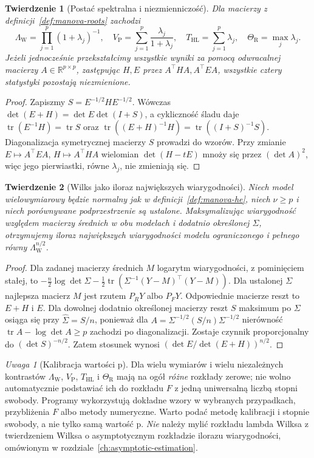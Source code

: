 \documentclass[11pt,a4paper,oneside]{report}
\numberwithin{equation}{chapter}
\theoremstyle{plain}
\newtheorem{twierdzenie}{Twierdzenie}[chapter]
\theoremstyle{definition}
\theoremstyle{remark}
\newtheorem{uwaga}{Uwaga}[chapter]
\newcommand{\R}{\mathbb R}
\begin{document}
\begin{twierdzenie}[Postać spektralna i niezmienniczość]\label{thm:manova-spectra}
Dla macierzy z definicji~\ref{def:manova-roots} zachodzi
\[
 \Lambda_{\mathrm W}=\prod_{j=1}^p(1+\lambda_j)^{-1},\quad
 V_{\mathrm P}=\sum_{j=1}^p\frac{\lambda_j}{1+\lambda_j},\quad
 T_{\mathrm{HL}}=\sum_{j=1}^p\lambda_j,\quad \Theta_{\mathrm R}=\max_j\lambda_j.
\]
Jeżeli jednocześnie przekształcimy wszystkie wyniki za pomocą odwracalnej macierzy $A\in\R^{p\times p}$, zastępując $H,E$ przez $A^\top HA,A^\top EA$, wszystkie cztery statystyki pozostają niezmienione.
\end{twierdzenie}
\begin{proof}
Zapiszmy $S=E^{-1/2}HE^{-1/2}$. Wówczas $\det(E+H)=\det E\det(I+S)$, a cykliczność śladu daje $\operatorname{tr}(E^{-1}H)=\operatorname{tr}S$ oraz $\operatorname{tr}((E+H)^{-1}H)=\operatorname{tr}((I+S)^{-1}S)$. Diagonalizacja symetrycznej macierzy $S$ prowadzi do wzorów. Przy zmianie $E\mapsto A^\top EA$, $H\mapsto A^\top HA$ wielomian $\det(H-tE)$ mnoży się przez $(\det A)^2$, więc jego pierwiastki, równe $\lambda_j$, nie zmieniają się.
\end{proof}

\begin{twierdzenie}[Wilks jako iloraz największych wiarygodności]\label{thm:wilks-lrt-manova}
Niech model wielowymiarowy będzie normalny jak w definicji~\ref{def:manova-he}, niech $\nu\ge p$ i niech porównywane podprzestrzenie są ustalone. Maksymalizując wiarygodność względem macierzy średnich w obu modelach i dodatnio określonej $\Sigma$, otrzymujemy iloraz największych wiarygodności modelu ograniczonego i pełnego równy $\Lambda_{\mathrm W}^{n/2}$.
\end{twierdzenie}
\begin{proof}
Dla zadanej macierzy średnich $M$ logarytm wiarygodności, z pominięciem stałej, to $-\frac n2\log\det\Sigma-\frac12\operatorname{tr}(\Sigma^{-1}(Y-M)^\top(Y-M))$. Dla ustalonej $\Sigma$ najlepsza macierz $M$ jest rzutem $P_RY$ albo $P_FY$. Odpowiednie macierze reszt to $E+H$ i $E$. Dla dowolnej dodatnio określonej macierzy reszt $S$ maksimum po $\Sigma$ osiąga się przy $\widehat\Sigma=S/n$, ponieważ dla $A=\Sigma^{-1/2}(S/n)\Sigma^{-1/2}$ nierówność $\operatorname{tr}A-\log\det A\ge p$ zachodzi po diagonalizacji. Zostaje czynnik proporcjonalny do $(\det S)^{-n/2}$. Zatem stosunek wynosi $(\det E/\det(E+H))^{n/2}$.
\end{proof}

\begin{uwaga}[Kalibracja wartości p]
Dla wielu wymiarów i wielu niezależnych kontrastów $\Lambda_{\mathrm W}$, $V_{\mathrm P}$, $T_{\mathrm{HL}}$ i $\Theta_{\mathrm R}$ mają na ogół \emph{różne} rozkłady zerowe; nie wolno automatycznie podstawiać ich do rozkładu $F$ z jedną uniwersalną liczbą stopni swobody. Programy wykorzystują dokładne wzory w wybranych przypadkach, przybliżenia $F$ albo metody numeryczne. Warto podać metodę kalibracji i stopnie swobody, a nie tylko samą wartość p. \emph{Nie} należy mylić rozkładu lambda Wilksa z twierdzeniem Wilksa o asymptotycznym rozkładzie ilorazu wiarygodności, omówionym w rozdziale~\ref{ch:asymptotic-estimation}.
\end{uwaga}
\end{document}
